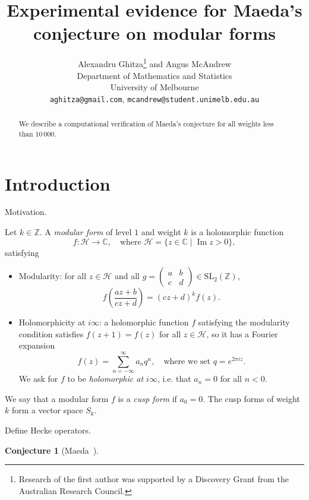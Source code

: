 \documentclass[11pt]{article}
\title{Experimental evidence for Maeda's conjecture on modular forms}
\author{
Alexandru Ghitza\footnote{Research of the first author was supported by 
a Discovery Grant from the Australian Research Council.}  
{} and 
Angus McAndrew\\
Department of Mathematics and Statistics\\
University of Melbourne\\
{\tt aghitza@gmail.com}, {\tt mcandrew@student.unimelb.edu.au}
}
\date{}
\theoremstyle{plain}
\newtheorem{conjecture}[theorem]{Conjecture}
\theoremstyle{definition}
\theoremstyle{remark}
\numberwithin{equation}{section}
\numberwithin{table}{section}
\newcommand{\longto}{\longrightarrow}
\newcommand{\CC}{\mathbb{C}}
\newcommand{\ZZ}{\mathbb{Z}}
\newcommand{\HH}{\mathcal{H}}
\renewcommand{\Im}{\operatorname{Im}}
\newcommand{\bound}{10\,000}
\newcommand{\SL}{\mathrm{SL}}
\begin{document}
\thispagestyle{empty}

\maketitle
\begin{abstract}
  We describe a computational verification of Maeda's conjecture for
  all weights less than $\bound$.
\end{abstract}


\section{Introduction}

Motivation.

Let $k\in\ZZ$.  A \emph{modular form} of level $1$ and weight $k$ is a
holomorphic function
\begin{equation*}
  f\colon\HH\longto\CC, \quad\text{where }
  \HH=\{z\in\CC\mid \Im z>0\},
\end{equation*}
satisfying
\begin{itemize}
  \item Modularity: for all $z\in\HH$ and all
    $g=\left(\begin{smallmatrix}a&b\\c&d\end{smallmatrix}\right)\in\SL_2(\ZZ)$,
      \begin{equation*}
        f\left(\frac{az+b}{cz+d}\right)=(cz+d)^kf(z).
      \end{equation*}
  \item Holomorphicity at $i\infty$: a holomorphic function $f$ satisfying the
    modularity condition satisfies $f(z+1)=f(z)$ for all $z\in\HH$, so it has
    a Fourier expansion
    \begin{equation*}
      f(z)=\sum_{n=-\infty}^\infty a_nq^n,\quad\text{where we set }
      q=e^{2\pi i z}.
    \end{equation*}
    We ask for $f$ to be \emph{holomorphic at $i\infty$}, i.e. that $a_n=0$
    for all $n<0$.
\end{itemize}

We say that a modular form $f$ is a \emph{cusp form} if $a_0=0$.  The cusp
forms of weight $k$ form a vector space $S_k$.

Define Hecke operators.

\begin{conjecture}[Maeda~\cite{Maeda}]
\end{conjecture}
\end{document}
